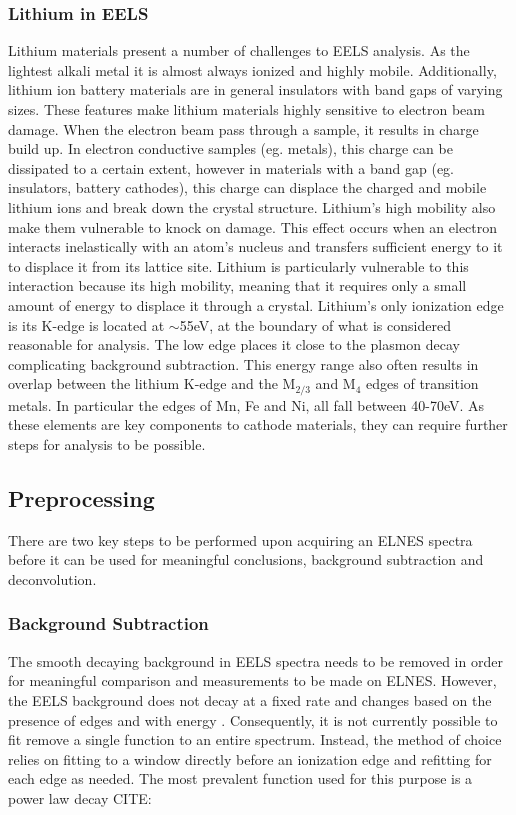 \subsubsection{Lithium in EELS}
Lithium materials present a number of challenges to EELS analysis.  As the lightest alkali metal it is almost always ionized and highly mobile. Additionally, lithium ion battery materials are in general insulators with band gaps of varying sizes. These features make lithium materials highly sensitive to electron beam damage.  When the electron beam pass through a sample, it results in charge build up.  In electron conductive samples (eg. metals), this charge can be dissipated to a certain extent, however in materials with a band gap (eg. insulators, battery cathodes), this charge can displace the charged and mobile lithium ions and break down the crystal structure.  Lithium's high mobility also make them vulnerable to knock on damage.  This effect occurs when an electron interacts inelastically with an atom's nucleus and transfers sufficient energy to it to displace it from its lattice site.  Lithium is particularly vulnerable to this interaction because its high mobility, meaning that it requires only a small amount of energy to displace it through a crystal.  
Lithium's only ionization edge is its K-edge is located at $\mathrm{\sim}$55eV, at the boundary of what is considered reasonable for analysis.  The low edge places it close to the plasmon decay complicating background subtraction.  This energy range also often results in overlap between the lithium K-edge and the $\mathrm{M_{2 / 3}}$ and $\mathrm{M_4}$ edges of transition metals. In particular the edges of Mn, Fe and Ni, all fall between 40-70eV.  As these elements are key components to cathode materials, they can require further steps for analysis to be possible.



\subsection{Preprocessing}

There are two key steps to be performed upon acquiring an ELNES spectra before it can be used for meaningful conclusions, background subtraction and deconvolution. 

\subsubsection{Background Subtraction}
The smooth decaying background in EELS spectra needs to be removed in order for meaningful comparison and measurements to be made on ELNES.  However, the EELS background does not decay at a fixed rate and changes based on the presence of edges and with energy \cite{new_bg}. Consequently, it is not currently possible to fit remove a single function to an entire spectrum.  Instead, the method of choice relies on fitting to a window directly before an ionization edge and refitting for each edge as needed.  The most prevalent function used for this purpose is a power law decay \cite{Egerton} CITE: 

